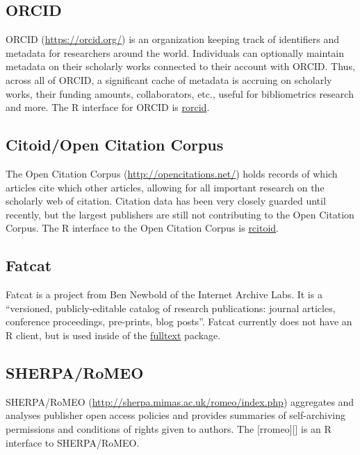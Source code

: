 \documentclass[author-year, review, 11pt]{components/elsarticle} %
\begin{document}
\hypertarget{orcid}{%
\subsection{ORCID}\label{orcid}}

ORCID (\url{https://orcid.org/}) is an organization keeping track of
identifiers and metadata for researchers around the world. Individuals
can optionally maintain metadata on their scholarly works connected to
their account with ORCID. Thus, across all of ORCID, a significant cache
of metadata is accruing on scholarly works, their funding amounts,
collaborators, etc., useful for bibliometrics research and more. The R
interface for ORCID is
\href{https://github.com/ropensci/rorcid}{rorcid}.

\hypertarget{citoidopen-citation-corpus}{%
\subsection{Citoid/Open Citation
Corpus}\label{citoidopen-citation-corpus}}

The Open Citation Corpus (\url{http://opencitations.net/}) holds records
of which articles cite which other articles, allowing for all important
research on the scholarly web of citation. Citation data has been very
closely guarded until recently, but the largest publishers are still not
contributing to the Open Citation Corpus. The R interface to the Open
Citation Corpus is
\href{https://github.com/ropenscilabs/rcitoid}{rcitoid}.

\hypertarget{fatcat}{%
\subsection{Fatcat}\label{fatcat}}

Fatcat is a project from Ben Newbold of the Internet Archive Labs. It is
a ``versioned, publicly-editable catalog of research publications:
journal articles, conference proceedings, pre-prints, blog posts''.
Fatcat currently does not have an R client, but is used inside of the
\href{https://github.com/ropensci/fulltext}{fulltext} package.

\hypertarget{sherparomeo}{%
\subsection{SHERPA/RoMEO}\label{sherparomeo}}

SHERPA/RoMEO (\url{http://sherpa.mimas.ac.uk/romeo/index.php})
aggregates and analyses publisher open access policies and provides
summaries of self-archiving permissions and conditions of rights given
to authors. The {[}rromeo{]}{[}{]} is an R interface to SHERPA/RoMEO.
\end{document}
